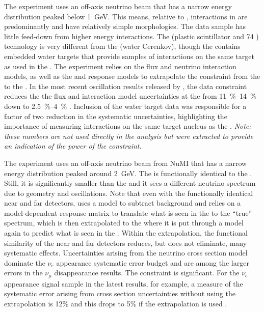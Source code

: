 The  experiment uses an off-axis neutrino beam that has a narrow energy distribution peaked below \SI{1}{GeV}. This means, relative to , interactions in  are predominantly  and have relatively simple morphologies.  The data sample has little feed-down from higher energy interactions.  The    (plastic scintillator and
74
 ) technology is very different from the   (water Cerenkov), though the  contains embedded water targets that provide samples of interactions on the same target as used in the .
The experiment relies on the flux and neutrino interaction models, as well as the  and   response models to extrapolate the constraint from the   to the  .   In the most recent oscillation results released by , the   data constraint reduces the the flux and interaction model uncertainties at the   from \SIrange{11}{14}{\%} down to \SIrange{2.5}{4}{\%}  \cite{Abe:2018wpn}. Inclusion of the water target data was responsible for a factor of two reduction in the systematic uncertainties, highlighting the importance of measuring interactions on the same target nucleus as the .  {\em Note: these numbers are not used directly in the analysis but were extracted to provide an indication of the power of the  constraint.}

The    experiment uses an off-axis neutrino beam from NuMI that has a narrow energy distribution peaked around \SI{2}{GeV}.  The      is functionally identical to the  .  Still, it is significantly smaller than the   and it sees a different neutrino spectrum due to geometry and oscillations.  Note that even with the functionally identical near and  far detectors,    uses a model to subtract  background and relies on a model-dependent response matrix to translate what is seen in the   to the ``true'' spectrum, which is then extrapolated to the   where it is put through a model again to predict what is seen in the   \cite{NOvA:2018gge, WolcottNUINT2018}.  Within the extrapolation, the functional similarity of the near and  far detectors reduces, but does not eliminate, many systematic effects.  Uncertainties arising from the neutrino cross section model dominate the    $\nu_{e}$ appearance systematic error budget and are among the larger errors in the $\nu_{\mu}$ disappearance results.  The   constraint is significant.  For the $\nu_{e}$ appearance signal sample in the latest    results, for example, a measure of the systematic error arising from cross section uncertainties without using the   extrapolation is 12\% and this drops to 5\% if the   extrapolation is used \cite{WolcottNUINT2018}.

